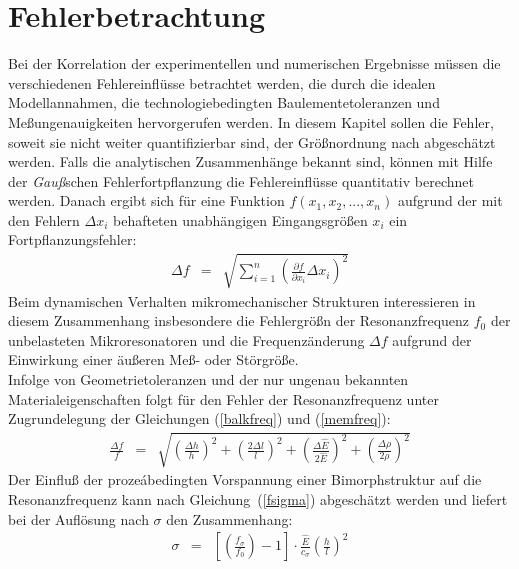 \section{Fehlerbetrachtung}
\label{fehlerbetrachtung}

Bei der Korrelation der experimentellen und numerischen Ergebnisse
müssen die verschiedenen Fehlereinflüsse betrachtet werden, die durch
die idealen Modellannahmen, die technologiebedingten Baulementetoleranzen
und Meßungenauigkeiten hervorgerufen werden. In diesem Kapitel sollen die
Fehler, soweit sie nicht weiter quantifizierbar sind, der Größnordnung nach
abgeschätzt werden. Falls die analytischen Zusammenhänge bekannt sind,
können mit Hilfe der {\em Gauß}schen Fehlerfortpflanzung die Fehlereinflüsse
quantitativ berechnet werden. Danach ergibt sich für eine Funktion
$f(x_{1}, x_{2},...,x_{n})$ aufgrund der mit den Fehlern $\Delta x_{i}$
behafteten unabhängigen Eingangsgrößen $x_{i}$ ein Fortpflanzungsfehler:
\begin{eqnarray}
\label{gaussfehler}
 {\Delta f} & = & \sqrt{ \sum_{i=1}^{n}
   {\left( \frac{\partial f}{\partial x_{i}} \Delta x_{i} \right)}^2 }
\end{eqnarray}
Beim dynamischen Verhalten mikromechanischer Strukturen interessieren in
diesem Zusammenhang insbesondere die Fehlergrößn der Resonanzfrequenz
$f_{0}$ der unbelasteten Mikroresonatoren und die Frequenzänderung
$\Delta f$ aufgrund der Einwirkung einer äußeren Meß- oder Störgröße.\\
%
Infolge von Geometrietoleranzen und der nur ungenau bekannten
Materialeigenschaften folgt für den Fehler der Resonanzfrequenz
unter Zugrundelegung der Gleichungen (\ref{balkfreq}) und (\ref{memfreq}):\\
\begin{eqnarray}
\label{fehlerfreq}
 \frac{{\Delta f}}{f} & = & \sqrt{
       {\left( \frac{\Delta h}{h} \right)}^2  +
       {\left( \frac{2\Delta l}{l} \right)}^2 +
       {\left( \frac{\Delta \hat E}{2 \hat E} \right)}^2 +
       {\left( \frac{\Delta \rho}{2 \rho} \right)}^2 }
\end{eqnarray}
Der Einfluß der prozeábedingten Vorspannung einer Bimorphstruktur auf die
Resonanzfrequenz kann nach Gleichung~(\ref{fsigma}) abgeschätzt werden und
liefert bei der Auflösung nach $\sigma$ den Zusammenhang:
\begin{eqnarray}
\label{sigmageom}
 \sigma & = & \left[ \left( \frac{f_{\sigma}}{f_{0}} \right) - 1 \right]
              \cdot \frac{\hat E}{c_{\sigma}}
              \left( \frac{h}{l} \right)^2
\end{eqnarray}
